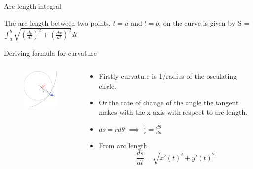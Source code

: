 \documentclass{beamer}
\begin{document}
\begin{frame}{Arc length integral}
	\begin{theorem}
		The arc length between two points, $t = a$ and $t = b$, on the curve is given by
		S = $\int_{a}^{b} \sqrt{\left( \frac{dy}{dt} \right)^2 + \left( \frac{dx}{dt} \right)^2 }dt$
	\end{theorem}
\end{frame}

\begin{frame}{Deriving formula for curvature}
	\begin{columns}
		\begin{column}{0.4\textwidth}
			\begin{figure}
				\centering
				\includegraphics[width=50mm, scale=0.4]{curvature_illustration.png}
			\end{figure}
		\end{column}
		\begin{column}{0.6\textwidth}
			\begin{itemize}
				\item Firstly curvature is 1/radius of the osculating circle.
				\item Or the rate of change of the angle the tangent makes with the x axis with respect to arc length.
				\item $ds=rd\theta$ $\implies$ $\frac{1}{r}=\frac{d\theta}{ds}$
				
				\item From arc length 
				\begin{equation} \label{eq:1}
					\frac{ds}{dt} = \sqrt{x'(t)^2+y'(t)^2} 
				\end{equation}
				
				
			
			\end{itemize}
			
			
			
		\end{column}
	\end{columns}

	
\end{frame}
\end{document}
